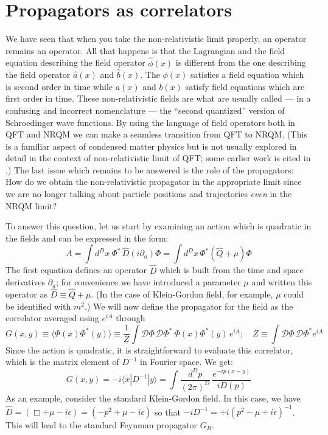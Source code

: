 \documentclass{article}
\def\bk#1#2#3{{\langle #1|#2|#3\rangle}}  %
\begin{document}
\section{Propagators as correlators}\label{sec:prcor}

We have seen that when you take the non-relativistic limit properly, an operator remains an operator. All that happens is that the Lagrangian and the field equation describing the field operator $\hat{\phi}(x)$ is different from the one describing the field operator $\hat{a}(x)$ and $\hat{b}(x)$. The $\phi(x)$ satisfies a field equation which is second order in time while $a(x)$ and $b(x)$ satisfy field equations which are first order in time. These non-relativistic fields are what are usually called --- in a confusing and incorrect nomenclature --- the ``second quantized'' version of Schroedinger wave functions. 
By using the language of field operators both in QFT and NRQM we can make a seamless transition from QFT to NRQM. (This is a familiar aspect of condensed matter physics but is not usually explored in detail in the context of non-relativistic limit of QFT; some earlier work is cited in \cite{G}.) The last issue which remains to be answered is the role of the propagators: How do we obtain the non-relativistic propagator in the appropriate limit since we are no longer talking about particle positions and trajectories \textit{even }in the NRQM limit? 
 
 To answer this question, let us start by examining an action which is quadratic in the fields and can be expressed in the form:
\begin{equation}
 A = \int d^D x\ \Phi^* \, \hat{D}(i \partial_a) \Phi = \int d^D x\, \Phi^*(\hat Q + \mu) \Phi
\end{equation} 
 The first equation defines an operator $\hat{D}$ which is built from the time and space derivatives $\partial_a$; for convenience we have introduced a parameter $\mu$ and written this operator as $\hat D \equiv \hat Q +\mu$. (In the case of Klein-Gordon field, for example, $\mu$ could be identified with $m^2$.) We will now define the propagator for the field as the correlator averaged using $e^{iA}$ through 
\begin{equation}
 G(x,y) \equiv\langle \Phi(x)\Phi^*(y)\rangle \equiv  \frac{1}{Z} \int \mathcal{D}\Phi\, \mathcal{D}\Phi^*\ \Phi(x) \Phi^*(y) \, e^{iA}; \quad Z\equiv \int \mathcal{D}\Phi\, \mathcal{D}\Phi^* e^{iA}
\end{equation} 
Since the action is quadratic, it is straightforward to evaluate this correlator, which is the matrix element of $D^{-1}$  in Fourier space. We get:
\begin{equation}
 G(x,y) = -i \bk{x}{D^{-1}}{y} = \int\frac{d^D p}{(2\pi)^D} \, \frac{e^{-ip(x-y)}}{iD(p)}
\end{equation} 
  As an example,  consider the standard Klein-Gordon field. In this case, we have 
$
 \hat D = (\Box + \mu - i \epsilon) = (-p^2 + \mu - i \epsilon)
$ so that 
$
 - i D^{-1} = +i (p^2  - \mu + i \epsilon)^{-1}
$. This will lead to the standard Feynman propagator $G_R$.  
\end{document}
